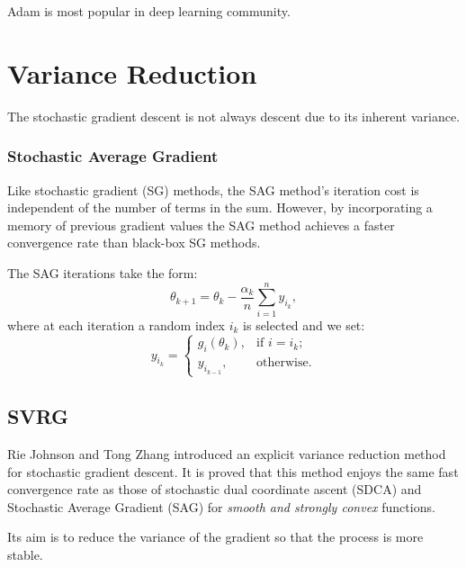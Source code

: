 \documentclass[11pt]{article} %
\begin{document}
Adam is most popular in deep learning community.%




\section{Variance Reduction}
The stochastic gradient descent is not always descent due to its inherent variance.

\subsubsection{Stochastic Average Gradient}
Like stochastic gradient (SG) methods, the SAG method’s iteration cost is independent of the number of terms in the sum.
However, by incorporating a memory of previous gradient values the SAG method achieves a faster convergence rate than black-box SG methods.


The SAG iterations take the form:
$${\theta}_{k+1}={\theta}_k - \frac{{\alpha}_k }{n}\sum _{i=1}^{n}y_{i_k} ,$$
where at each iteration a random index $i_k$ is selected and we set:
$$y_{i_k}=
\begin{cases}
g_{i}({\theta}_k),  & \text{if $i=i_k$}; \\
y_{i_{k-1}}, & \text{otherwise}.
\end{cases}$$

\subsection{SVRG}%
Rie Johnson and Tong Zhang introduced an explicit variance reduction method for stochastic gradient descent.
It is proved that this method enjoys the same fast convergence rate as those of stochastic dual coordinate ascent (SDCA) and Stochastic Average Gradient (SAG) for \emph{smooth and strongly convex} functions.

Its aim is to reduce the variance of the gradient so that the process is more stable.
%
%
%
\end{document}
